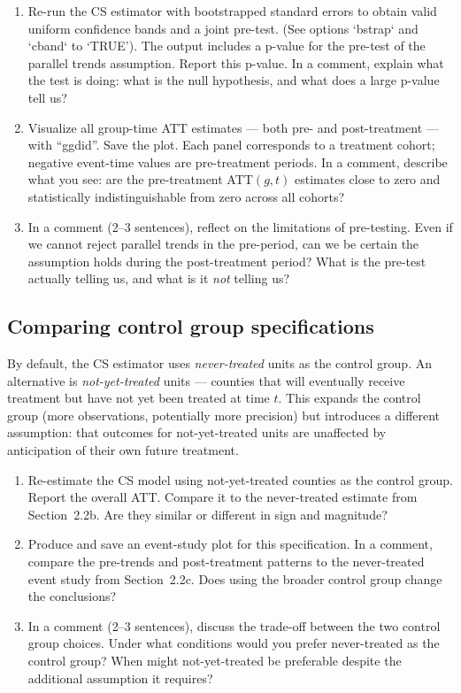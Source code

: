 \begin{enumerate}[label=\alph*)]
  \item Re-run the CS estimator with bootstrapped standard errors to obtain valid uniform confidence bands and a joint pre-test. (See options `bstrap` and `cband` to `TRUE').
  The  output includes a p-value for the pre-test of the parallel trends assumption. Report this p-value. In a comment, explain what the test is doing: what is the null hypothesis, and what does a large p-value tell us?
  \item Visualize all group-time ATT estimates --- both pre- and post-treatment --- with ``ggdid''. Save the plot. Each panel corresponds to a treatment cohort; negative event-time values are pre-treatment periods. In a comment, describe what you see: are the pre-treatment ATT$(g,t)$ estimates close to zero and statistically indistinguishable from zero across all cohorts?
  \item In a comment (2--3 sentences), reflect on the limitations of pre-testing. Even if we cannot reject parallel trends in the pre-period, can we be certain the assumption holds during the post-treatment period? What is the pre-test actually telling us, and what is it \textit{not} telling us?
\end{enumerate}

\subsection{Comparing control group specifications}

By default, the CS estimator uses \textit{never-treated} units as the control group. An alternative is \textit{not-yet-treated} units --- counties that will eventually receive treatment but have not yet been treated at time $t$. This expands the control group (more observations, potentially more precision) but introduces a different assumption: that outcomes for not-yet-treated units are unaffected by anticipation of their own future treatment.

\begin{enumerate}[label=\alph*)]
  \item Re-estimate the CS model using not-yet-treated counties as the control group. Report the overall ATT. Compare it to the never-treated estimate from Section~2.2b. Are they similar or different in sign and magnitude?
  \item Produce and save an event-study plot for this specification. In a comment, compare the pre-trends and post-treatment patterns to the never-treated event study from Section~2.2c. Does using the broader control group change the conclusions?
  \item In a comment (2--3 sentences), discuss the trade-off between the two control group choices. Under what conditions would you prefer never-treated as the control group? When might not-yet-treated be preferable despite the additional assumption it requires?
\end{enumerate}

